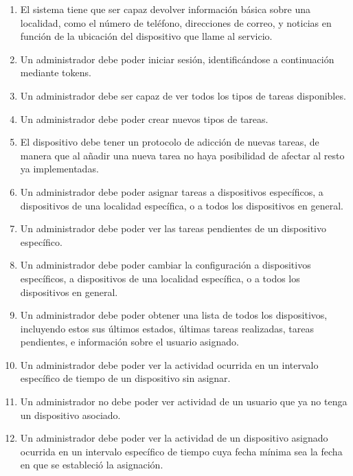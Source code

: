 \begin{enumerate}[label=RF\arabic* -]
    \item El sistema tiene que ser capaz devolver información básica sobre una localidad, como el número de teléfono, direcciones de correo, y noticias en función de la ubicación del dispositivo que llame al servicio.
    
    \item Un administrador debe poder iniciar sesión, identificándose a continuación mediante tokens.
    
    \item Un administrador debe ser capaz de ver todos los tipos de tareas disponibles.
    
    \item Un administrador debe poder crear nuevos tipos de tareas.
    
    \item El dispositivo debe tener un protocolo de adicción de nuevas tareas, de manera que al añadir una nueva tarea no haya posibilidad de afectar al resto ya implementadas.
    
    \item Un administrador debe poder asignar tareas a dispositivos específicos, a dispositivos de una localidad específica, o a todos los dispositivos en general.
    
    \item Un administrador debe poder ver las tareas pendientes de un dispositivo específico.
    
    \item Un administrador debe poder cambiar la configuración a dispositivos específicos, a dispositivos de una localidad específica, o a todos los dispositivos en general.
    
    \item Un administrador debe poder obtener una lista de todos los dispositivos, incluyendo estos sus últimos estados, últimas tareas realizadas, tareas pendientes, e información sobre el usuario asignado.
    
    \item Un administrador debe poder ver la actividad ocurrida en un intervalo específico de tiempo de un dispositivo sin asignar.
    
    \item Un administrador no debe poder ver actividad de un usuario que ya no tenga un dispositivo asociado.
    
    \item Un administrador debe poder ver la actividad de un dispositivo asignado ocurrida en un intervalo específico de tiempo cuya fecha mínima sea la fecha en que se estableció la asignación.
    

\end{enumerate}
